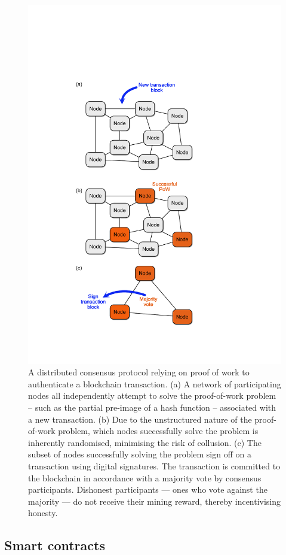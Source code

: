 \begin{figure}[!htb]
\includegraphics[width=0.8\columnwidth]{figures/distributed_consensus}
\caption{A distributed consensus protocol relying on proof of work to authenticate a blockchain transaction. (a) A network of participating nodes all independently attempt to solve the  proof-of-work problem -- such as the partial pre-image of a hash function -- associated with a new transaction. (b) Due to the unstructured nature of the proof-of-work problem, which nodes successfully solve the problem is inherently randomised, minimising the risk of collusion. (c) The subset of nodes successfully solving the problem sign off on a transaction using digital signatures. The transaction is committed to the blockchain in accordance with a majority vote by consensus participants. Dishonest participants --- ones who vote against the majority --- do not receive their mining reward, thereby incentivising honesty.} \label{fig:distributed_consensus}
\end{figure}

\subsection{Smart contracts}

